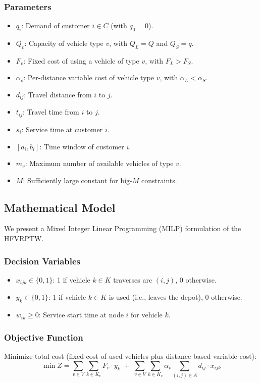 \documentclass[11pt]{article}
\begin{document}
\subsubsection{Parameters}
\begin{itemize}[leftmargin=*]
    \item $q_i$: Demand of customer $i \in C$ (with $q_0 = 0$).
    \item $Q_v$: Capacity of vehicle type $v$, with $Q_L = Q$ and $Q_S = q$.
    \item $F_v$: Fixed cost of using a vehicle of type $v$, with $F_L > F_S$.
    \item $\alpha_v$: Per-distance variable cost of vehicle type $v$, with $\alpha_L < \alpha_S$.
    \item $d_{ij}$: Travel distance from $i$ to $j$.
    \item $t_{ij}$: Travel time from $i$ to $j$.
    \item $s_i$: Service time at customer $i$.
    \item $[a_i, b_i]$: Time window of customer $i$.
    \item $m_v$: Maximum number of available vehicles of type $v$.
    \item $M$: Sufficiently large constant for big-$M$ constraints.
\end{itemize}

\subsection{Mathematical Model}

We present a Mixed Integer Linear Programming (MILP) formulation of the HFVRPTW.

\subsubsection{Decision Variables}
\begin{itemize}[leftmargin=*]
    \item $x_{ijk} \in \{0,1\}$: 1 if vehicle $k \in K$ traverses arc $(i,j)$, 0 otherwise.
    \item $y_k \in \{0,1\}$: 1 if vehicle $k \in K$ is used (i.e., leaves the depot), 0 otherwise.
    \item $w_{ik} \geq 0$: Service start time at node $i$ for vehicle $k$.
\end{itemize}

\subsubsection{Objective Function}
Minimize total cost (fixed cost of used vehicles plus distance-based variable cost):
\begin{equation}
\min Z = \sum_{v \in V} \sum_{k \in K_v} F_v \cdot y_k \;+\; \sum_{v \in V} \sum_{k \in K_v} \alpha_v \sum_{(i,j) \in A} d_{ij} \cdot x_{ijk}
\end{equation}
\end{document}

